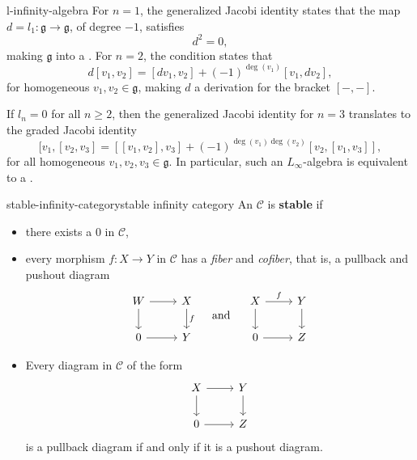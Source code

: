 \begin{example}{l-infinity-algebra}
    For $n = 1$, the generalized Jacobi identity states that the map $d = l_1 : \mathfrak{g} \to \mathfrak{g}$, of degree $-1$, satisfies
    \[ d^2 = 0 , \]
    making $\mathfrak{g}$ into a . For $n = 2$, the condition states that
    \[ d[v_1, v_2] = [dv_1, v_2] + (-1)^{\deg(v_1)} [v_1, dv_2] , \]
    for homogeneous $v_1, v_2 \in \mathfrak{g}$, making $d$ a derivation for the bracket $[-, -]$.
    
    If $l_n = 0$ for all $n \ge 2$, then the generalized Jacobi identity for $n = 3$ translates to the graded Jacobi identity
    \[ [v_1, [v_2, v_3] = [[v_1, v_2], v_3] + (-1)^{\deg(v_1) \deg(v_2)} [v_2, [v_1, v_3]] , \]
    for all homogeneous $v_1, v_2, v_3 \in \mathfrak{g}$. In particular, such an $L_\infty$-algebra is equivalent to a .
\end{example}

\begin{topic}{stable-infinity-category}{stable infinity category}
    An  $\mathcal{C}$ is \textbf{stable} if
    \begin{itemize}
        \item there exists a  $0$ in $\mathcal{C}$,
        \item every morphism $f : X \to Y$ in $\mathcal{C}$ has a \textit{fiber} and \textit{cofiber}, that is, a pullback and pushout diagram
        \[ \begin{tikzcd} W \arrow{r} \arrow{d} & X \arrow{d}{f} \\ 0 \arrow{r} & Y \end{tikzcd} \quad \textup{ and } \quad \begin{tikzcd} X \arrow{r}{f} \arrow{d} & Y \arrow{d} \\ 0 \arrow{r} & Z \end{tikzcd} \]
        \item Every diagram in $\mathcal{C}$ of the form
        \[ \begin{tikzcd} X \arrow{r} \arrow{d} & Y \arrow{d} \\ 0 \arrow{r} & Z \end{tikzcd} \]
        is a pullback diagram if and only if it is a pushout diagram.
    \end{itemize}
\end{topic}

